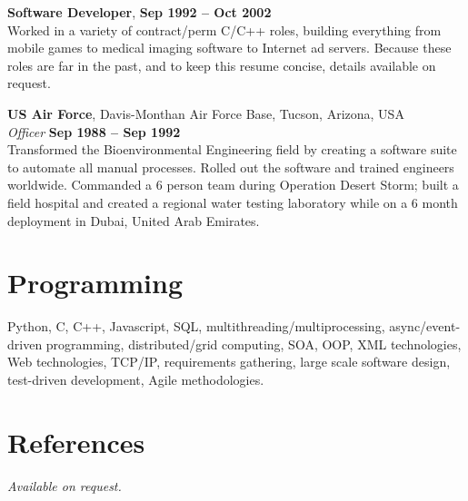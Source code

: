 \documentclass[margin,line]{resume}
\begin{document}
\begin{resume}
    \textbf{Software Developer},  \hfill \textbf{Sep 1992 -- Oct 2002}\\
	Worked in a variety of contract/perm C/C++ roles, building everything from mobile games to medical imaging software to Internet ad servers. Because these roles are far in the past, and to keep this resume concise, details available on request. 
	
    \textbf{US Air Force}, Davis-Monthan Air Force Base, Tucson, Arizona, USA \vspace{2mm}\\\vspace{1mm}%
    \textsl{Officer} \hfill \textbf{Sep 1988 -- Sep 1992}\\
	Transformed the Bioenvironmental Engineering field by creating a software suite to automate all manual processes. 
	Rolled out the software and trained engineers worldwide. Commanded a 6 person team during Operation Desert Storm; built
	a field hospital and created a regional water testing laboratory while on a 6 month deployment in Dubai, United Arab Emirates.
	
	
    \section{\mysidestyle Programming} 

    Python, C, C++, Javascript, SQL, multithreading/multiprocessing, async/event-driven programming, distributed/grid computing, SOA, OOP, XML technologies, 
    Web technologies, TCP/IP, requirements gathering, large scale software design, test-driven development, Agile methodologies.



    \section{\mysidestyle References} 
    {\sl Available on request.}



\end{resume}
\end{document}
